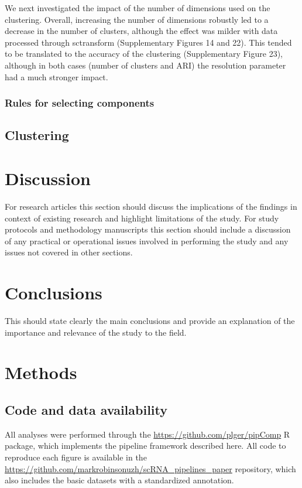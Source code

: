 \documentclass{bmcart}
\begin{document}
We next investigated the impact of the number of dimensions used on the clustering. Overall, increasing the number of dimensions robustly led to a decrease in the number of clusters, although the effect was milder with data processed through sctransform (Supplementary Figures 14 and 22). This tended to be translated to the accuracy of the clustering (Supplementary Figure 23), although in both cases (number of clusters and ARI) the resolution parameter had a much stronger impact.

\subsubsection*{Rules for selecting components}

\subsection*{Clustering}



\section*{Discussion}

For research articles this section should discuss the implications of the findings in context of existing research and highlight limitations of the study. For study protocols and methodology manuscripts this section should include a discussion of any practical or operational issues involved in performing the study and any issues not covered in other sections.

\section*{Conclusions}

This should state clearly the main conclusions and provide an explanation of the importance and relevance of the study to the field.

\section*{Methods}

\subsection*{Code and data availability}

All analyses were performed through the \href{pipComp}{https://github.com/plger/pipComp} R package, which implements the pipeline framework described here. All code to reproduce each figure is available in the \url{https://github.com/markrobinsonuzh/scRNA\_pipelines\_paper} repository, which also includes the basic datasets with a standardized annotation.
\end{document}
